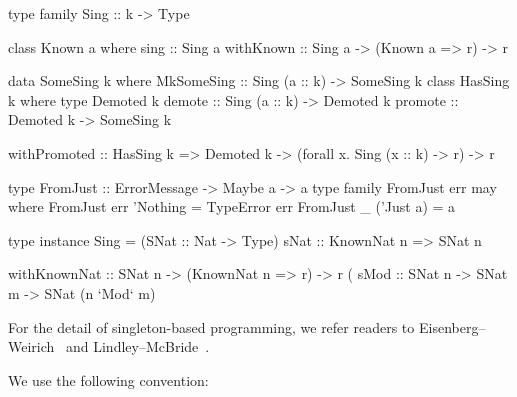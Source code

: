 \documentclass[demotion-paper.tex]{subfiles}
\begin{document}
\begin{code}
type family Sing :: k -> Type

class Known a where
  sing :: Sing a
withKnown :: Sing a -> (Known a => r) -> r

data SomeSing k where
  MkSomeSing :: Sing (a :: k) -> SomeSing k
class HasSing k where
  type Demoted k 
  demote :: Sing (a :: k) -> Demoted k
  promote :: Demoted k -> SomeSing k

withPromoted :: HasSing k
  => Demoted k
  -> (forall x. Sing (x :: k) -> r) -> r

type FromJust :: ErrorMessage -> Maybe a -> a
type family FromJust err may where 
  FromJust err 'Nothing = TypeError err
  FromJust _ ('Just a)  = a

type instance Sing = (SNat :: Nat -> Type)
sNat :: KnownNat n => SNat n

withKnownNat :: SNat n -> (KnownNat n => r) -> r
(%
sMod :: SNat n -> SNat m -> SNat (n `Mod` m)
\end{code}

For the detail of singleton-based programming, we refer readers to Eisenberg--Weirich~\cite{Eisenberg:2012} and Lindley--McBride~\cite{10.1145/2503778.2503786}.

We use the following convention:
\end{document}
